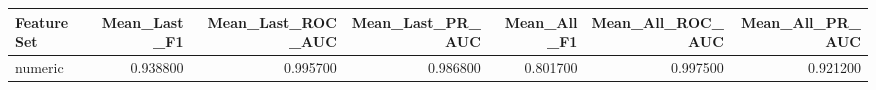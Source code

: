 \begin{tabular}{lrrrrrr}
\toprule
Feature Set & Mean\_Last\_F1 & Mean\_Last\_ROC\_AUC & Mean\_Last\_PR\_AUC & Mean\_All\_F1 & Mean\_All\_ROC\_AUC & Mean\_All\_PR\_AUC \\
\midrule
numeric & 0.938800 & 0.995700 & 0.986800 & 0.801700 & 0.997500 & 0.921200 \\
\bottomrule
\end{tabular}
